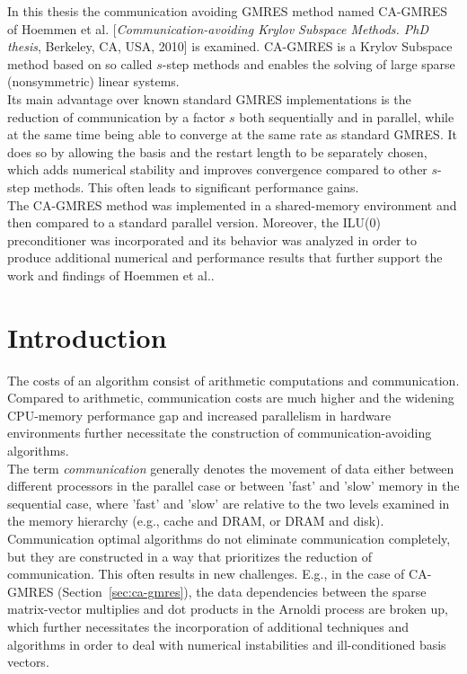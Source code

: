 \documentclass{scrartcl}
\numberwithin{equation}{section}
\begin{document}
\begin{onecolabstract}
In this thesis the communication avoiding GMRES method named CA-GMRES of Hoemmen et al. [\textit{Communication-avoiding Krylov Subspace Methods. PhD thesis}, Berkeley, CA, USA, 2010] is examined. CA-GMRES is a Krylov Subspace method based on so called $s$-step methods and enables the solving of large sparse (nonsymmetric) linear systems.\\ Its main advantage over known standard GMRES implementations is the reduction of communication by a factor $s$ both sequentially and in parallel, while at the same time being able to converge at the same rate as standard GMRES. It does so by allowing the basis and the restart length to be separately chosen, which adds numerical stability and improves convergence compared to other $s$-step methods. This often leads to significant performance gains.\\ The CA-GMRES method was implemented in a shared-memory environment and then compared to a standard parallel version. Moreover, the ILU(0) preconditioner was incorporated and its behavior was analyzed in order to produce additional numerical and performance results that further support the work and findings of Hoemmen et al..
\end{onecolabstract}

\section{Introduction}
The costs of an algorithm consist of arithmetic computations and communication.
Compared to arithmetic, communication costs are much higher and the widening CPU-memory performance gap and increased parallelism in hardware environments further necessitate the construction of communication-avoiding algorithms.\\
The term \textit{communication} generally denotes the movement of data either between different processors in the parallel case or between 'fast' and 'slow' memory in the sequential case, where 'fast' and 'slow' are relative to the two levels examined in the memory hierarchy (e.g., cache and DRAM, or DRAM and disk). Communication optimal algorithms do not eliminate communication completely, but they are constructed in a way that prioritizes the reduction of communication. This often results in new challenges. E.g., in the case of CA-GMRES (Section~\ref{sec:ca-gmres}), the data dependencies between the sparse matrix-vector multiplies and dot products in the Arnoldi process are broken up, which further necessitates the incorporation of additional techniques and algorithms in order to deal with numerical instabilities and ill-conditioned basis vectors.\\
\end{document}
